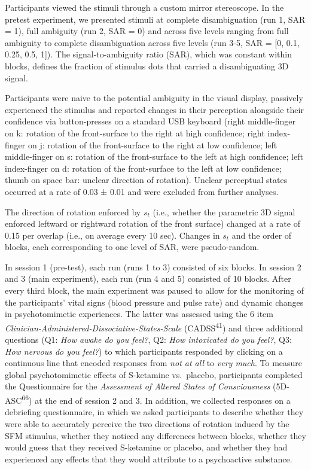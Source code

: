 \documentclass[
]{article}
\begin{document}
Participants viewed the stimuli through a custom mirror stereoscope. In
the pretest experiment, we presented stimuli at complete disambiguation
(run 1, SAR = 1), full ambiguity (run 2, SAR = 0) and across five levels
ranging from full ambiguity to complete disambiguation across five
levels (run 3-5, SAR = {[}0, 0.1, 0.25, 0.5, 1{]}). The
signal-to-ambiguity ratio (SAR), which was constant within blocks,
defines the fraction of stimulus dots that carried a disambiguating 3D
signal.

Participants were naive to the potential ambiguity in the visual
display, passively experienced the stimulus and reported changes in
their perception alongside their confidence via button-presses on a
standard USB keyboard (right middle-finger on k: rotation of the
front-surface to the right at high confidence; right index-finger on j:
rotation of the front-surface to the right at low confidence; left
middle-finger on s: rotation of the front-surface to the left at high
confidence; left index-finger on d: rotation of the front-surface to the
left at low confidence; thumb on space bar: unclear direction of
rotation). Unclear perceptual states occurred at a rate of 0.03 ± 0.01
and were excluded from further analyses.

The direction of rotation enforced by \(s_t\) (i.e., whether the
parametric 3D signal enforced leftward or rightward rotation of the
front surface) changed at a rate of 0.15 per overlap (i.e., on average
every 10 sec). Changes in \(s_t\) and the order of blocks, each
corresponding to one level of SAR, were pseudo-random.

In session 1 (pre-test), each run (runs 1 to 3) consisted of six blocks.
In session 2 and 3 (main experiment), each run (run 4 and 5) consisted
of 10 blocks. After every third block, the main experiment was paused to
allow for the monitoring of the participants' vital signs (blood
pressure and pulse rate) and dynamic changes in psychotomimetic
experiences. The latter was assessed using the 6 item
\emph{Clinician-Administered-Dissociative-States-Scale}
(CADSS\textsuperscript{41}) and three additional questions (Q1:
\emph{How awake do you feel?}, Q2: \emph{How intoxicated do you feel?},
Q3: \emph{How nervous do you feel?}) to which participants responded by
clicking on a continuous line that encoded responses from \emph{not at
all} to \emph{very much}. To measure global psychotomimetic effects of
S-ketamine vs.~placebo, participants completed the Questionnaire for the
\emph{Assessment of Altered States of Consciousness}
(5D-ASC\textsuperscript{66}) at the end of session 2 and 3. In addition,
we collected responses on a debriefing questionnaire, in which we asked
participants to describe whether they were able to accurately perceive
the two directions of rotation induced by the SFM stimulus, whether they
noticed any differences between blocks, whether they would guess that
they received S-ketamine or placebo, and whether they had experienced
any effects that they would attribute to a psychoactive substance.
\end{document}
